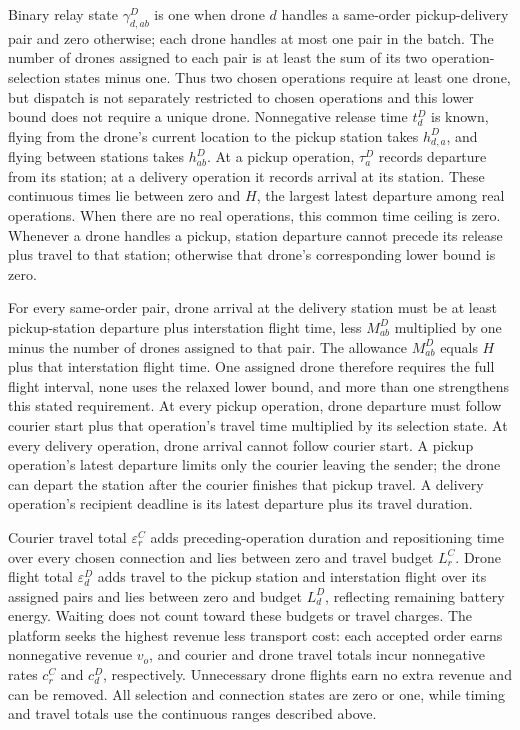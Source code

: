 \documentclass[10pt]{article}
\begin{document}
Binary relay state $\gamma^D_{d,ab}$ is one when drone $d$ handles a same-order pickup-delivery pair and zero otherwise; each drone handles at most one pair in the batch. The number of drones assigned to each pair is at least the sum of its two operation-selection states minus one. Thus two chosen operations require at least one drone, but dispatch is not separately restricted to chosen operations and this lower bound does not require a unique drone. Nonnegative release time $t_d^D$ is known, flying from the drone's current location to the pickup station takes $h_{d,a}^D$, and flying between stations takes $h_{ab}^D$. At a pickup operation, $\tau_a^D$ records departure from its station; at a delivery operation it records arrival at its station. These continuous times lie between zero and $H$, the largest latest departure among real operations. When there are no real operations, this common time ceiling is zero. Whenever a drone handles a pickup, station departure cannot precede its release plus travel to that station; otherwise that drone's corresponding lower bound is zero.

For every same-order pair, drone arrival at the delivery station must be at least pickup-station departure plus interstation flight time, less $M_{ab}^D$ multiplied by one minus the number of drones assigned to that pair. The allowance $M_{ab}^D$ equals $H$ plus that interstation flight time. One assigned drone therefore requires the full flight interval, none uses the relaxed lower bound, and more than one strengthens this stated requirement. At every pickup operation, drone departure must follow courier start plus that operation's travel time multiplied by its selection state. At every delivery operation, drone arrival cannot follow courier start. A pickup operation's latest departure limits only the courier leaving the sender; the drone can depart the station after the courier finishes that pickup travel. A delivery operation's recipient deadline is its latest departure plus its travel duration.

Courier travel total $\varepsilon_r^C$ adds preceding-operation duration and repositioning time over every chosen connection and lies between zero and travel budget $L_r^C$. Drone flight total $\varepsilon_d^D$ adds travel to the pickup station and interstation flight over its assigned pairs and lies between zero and budget $L_d^D$, reflecting remaining battery energy. Waiting does not count toward these budgets or travel charges. The platform seeks the highest revenue less transport cost: each accepted order earns nonnegative revenue $v_o$, and courier and drone travel totals incur nonnegative rates $c_r^C$ and $c_d^D$, respectively. Unnecessary drone flights earn no extra revenue and can be removed. All selection and connection states are zero or one, while timing and travel totals use the continuous ranges described above.
\end{document}
